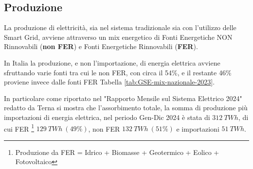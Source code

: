 
\newpage
\subsection{Produzione}

La produzione di elettricità, sia nel sistema tradizionale sia con l'utilizzo delle Smart Grid, avviene attraverso un mix energetico di Fonti Energetiche NON Rinnovabili (\textbf{non FER}) e Fonti Energetiche Rinnovabili (\textbf{FER}).

In Italia la produzione, e non l'importazione, di energia elettrica avviene sfruttando varie fonti tra cui le non FER, con circa il 54\%, e il restante 46\% proviene invece dalle fonti FER Tabella \ref{tab:GSE-mix-nazionale-2023}.

In particolare come riportato nel "Rapporto Mensile sul Sistema Elettrico 2024" redatto da Terna \cite{TernaRapporto2024} si mostra che l'assorbimento totale, la somma di produzione più importazioni di energia elettrica, nel periodo Gen-Dic 2024 è stata di $312\ TWh$, di cui FER \footnote{Produzione da FER = Idrico + Biomasse + Geotermico + Eolico + Fotovoltaico} $129\ TWh\ (49\%)$, non FER $132\ TWh\ (51\%)$ e importazioni $51\ TWh$.







